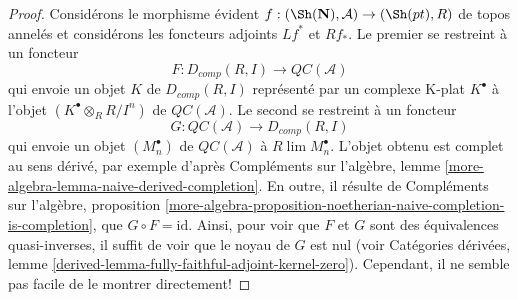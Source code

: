 \begin{proof}
Considérons le morphisme évident $f : (\Sh(\mathbf{N}), \mathcal{A}) \to (\Sh(pt), R)$ de topos annelés et considérons les foncteurs adjoints $Lf^*$ et $Rf_*$.
Le premier se restreint à un foncteur
$$
F : D_{comp}(R, I) \longrightarrow \mathit{QC}(\mathcal{A})
$$
qui envoie un objet $K$ de $D_{comp}(R, I)$ représenté par un complexe K-plat $K^\bullet$ à l'objet $(K^\bullet \otimes_R R/I^n)$ de $\mathit{QC}(\mathcal{A})$.
Le second se restreint à un foncteur
$$
G : \mathit{QC}(\mathcal{A}) \longrightarrow D_{comp}(R, I)
$$
qui envoie un objet $(M_n^\bullet)$ de $\mathit{QC}(\mathcal{A})$ à $R\lim M_n^\bullet$.
L'objet obtenu est complet au sens dérivé, par exemple d'après Compléments sur l'algèbre, lemme \ref{more-algebra-lemma-naive-derived-completion}.
En outre, il résulte de Compléments sur l'algèbre, proposition \ref{more-algebra-proposition-noetherian-naive-completion-is-completion}, que $G \circ F = \text{id}$.
Ainsi, pour voir que $F$ et $G$ sont des équivalences quasi-inverses, il suffit de voir que le noyau de $G$ est nul (voir Catégories dérivées, lemme \ref{derived-lemma-fully-faithful-adjoint-kernel-zero}).
Cependant, il ne semble pas facile de le montrer directement!


\end{proof}
